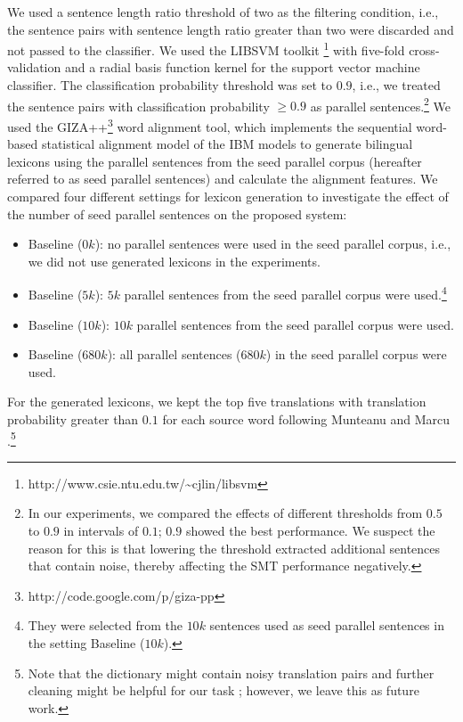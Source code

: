 \documentclass[english]{jnlp_1.4}
\begin{document}
We used a sentence length ratio threshold of two as the filtering condition,
i.e., the sentence pairs with sentence length ratio greater than two were discarded and not
passed to the classifier. 
We used the LIBSVM toolkit \cite{CC01a}\footnote{http://www.csie.ntu.edu.tw/\~{}cjlin/libsvm} 
with five-fold cross-validation and a radial basis function kernel for the support vector machine classifier.
The classification probability threshold was set to $0.9$, i.e., we treated
the sentence pairs with classification probability $\geq 0.9$ as parallel sentences.\footnote{
  In our experiments, we compared the effects of different thresholds from $0.5$ to $0.9$ 
  in intervals of $0.1$; $0.9$ showed the best performance. We suspect the reason for 
  this is that lowering the threshold extracted additional sentences that contain noise, 
  thereby affecting the SMT performance negatively.}
We used the GIZA++\footnote{http://code.google.com/p/giza-pp} word alignment tool,
which implements the sequential word-based statistical alignment model of
the IBM models \cite{brown-EtAl:1993} to generate bilingual lexicons using the parallel
sentences from the seed parallel corpus (hereafter referred to as seed parallel sentences) and calculate the alignment features.
We compared {four} different settings for lexicon generation to investigate
the effect of the number of seed parallel sentences on the proposed system:
\begin{itemize}
\item {Baseline ($0k$): no parallel sentences were used in the seed parallel corpus, 
i.e., we did not use generated lexicons in the experiments.}
\item Baseline ($5k$): {$5k$ parallel sentences from the seed parallel corpus were used.\footnote{They 
were selected from the $10k$ sentences used as seed parallel sentences in the setting Baseline ($10k$).}}
\item Baseline ($10k$): $10k$ parallel sentences from the seed parallel corpus were used.
\item Baseline ($680k$): all parallel sentences ($680k$) in the seed parallel corpus were used.
\end{itemize}
For the generated lexicons, we kept the top five translations with translation probability 
greater than $0.1$ for each source word following Munteanu and Marcu \citeyear{Munteanu:2005}.\footnote{Note 
    that the dictionary might contain noisy translation pairs and further cleaning might be 
    helpful for our task \cite{AKER14.803.L14-1623}; however, we leave this as future work.}
\end{document}
